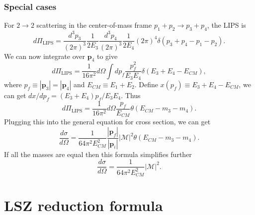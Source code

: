 \subsubsection{Special cases}
\noindent
For $2 \to 2$ scattering in the center-of-mass frame
$p_1 + p_2 \to p_3 + p_4$,
the LIPS is
\[d\Pi_{\mathrm{LIPS}} = \frac{d^3p_3}{(2\pi)^3} \frac{1}{2E_3 } \frac{d^3p_4}{(2\pi)^3} \frac{1}{2E_4} (2\pi)^4 \delta(p_3+p_4-p_1-p_2).\]
We can now integrate over $\bm{p}_4$ to give
\[d\Pi_{\mathrm{LIPS}} = \frac{1}{16\pi^2} d\Omega \int dp_f \frac{p_f^2}{E_3 E_4} \delta(E_3+E_4 -E_{CM}),\]
where $p_f \equiv |\bm{p}_3| = |\bm{p}_4|$ and $E_{CM} \equiv E_1 + E_2$.
Define $x(p_f) \equiv E_3 + E_4 - E_{CM}$, we can get
$dx/dp_f = (E_3+E_4)p_f/E_3E_4$.
Thus
\[d\Pi_{\mathrm{LIPS}} = \frac{1}{16\pi^2} d\Omega \frac{p_f}{E_{CM}}\theta (E_{CM} - m_3 -m_4).\]
Plugging this into the general equation for cross section, we can get
\[ \frac{d\sigma}{d\Omega} = \frac{1}{64\pi^2 E_{CM}^2} \frac{|\bm{p}_f|}{|\bm{p}_i|} |\mathcal{M}|^2 \theta (E_{CM} - m_3 -m_4) .\]
If all the masses are equal then this formula simplifies further
\[\frac{d\sigma}{d\Omega} = \frac{1}{64\pi^2 E_{CM}^2} |\mathcal{M}|^2.\]

\section{LSZ reduction formula}
